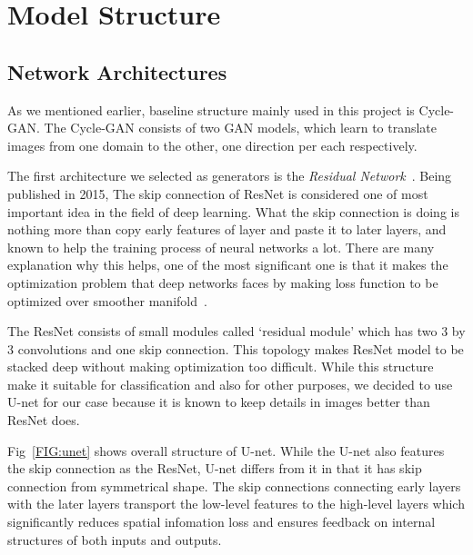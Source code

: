 \chapter{Model Structure}\label{Ch:Model}

\section{Network Architectures}

As we mentioned earlier, baseline structure mainly used in this project is Cycle-GAN. The Cycle-GAN consists of two GAN models, which learn to translate images from one domain to the other, one direction per each respectively. 

The first architecture we selected as generators is the \emph{Residual Network}~\cite{resnet}. Being published in 2015, The skip connection of ResNet is considered one of most important idea in the field of deep learning. What the skip connection is doing is nothing more than copy early features of layer and paste it to later layers, and known to help the training process of neural networks a lot. There are many explanation why this helps, one of the most significant one is that it makes the optimization problem that deep networks faces by making loss function to be optimized over smoother manifold~\cite{li2018visualizing}.

The ResNet consists of small modules called `residual module' which has two 3 by 3 convolutions and one skip connection. This topology makes ResNet model to be stacked deep without making optimization too difficult. While this structure make it suitable for classification and also for other purposes, we decided to use U-net for our case because it is known to keep details in images better than ResNet does.

Fig~\ref{FIG:unet} shows overall structure of U-net. While the U-net also features the skip connection as the ResNet, U-net differs from it in that it has skip connection from symmetrical shape. The skip connections connecting early layers with the later layers transport the low-level features to the high-level layers which significantly reduces spatial infomation loss and ensures feedback on internal structures of both inputs and outputs.

